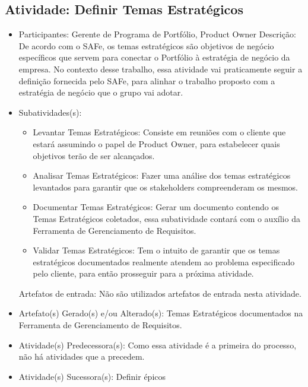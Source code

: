 \subsection{Atividade: Definir Temas Estratégicos}
\begin{itemize}
\item Participantes: Gerente de Programa de Portfólio, Product Owner
Descrição: De acordo com o SAFe, os temas estratégicos são objetivos de negócio específicos que servem para conectar o Portfólio à estratégia de negócio da empresa. No contexto desse trabalho, essa atividade vai praticamente seguir a definição fornecida pelo SAFe, para alinhar o trabalho proposto com a estratégia de negócio que o grupo vai adotar. 

\item Subatividades(s): 
    \begin{itemize}
    \item Levantar Temas Estratégicos: Consiste em reuniões com o cliente que estará assumindo o papel de Product Owner, para estabelecer quais objetivos terão de ser alcançados.
    \item Analisar Temas Estratégicos: Fazer uma análise dos temas estratégicos levantados para garantir que os stakeholders compreenderam os mesmos.
    \item Documentar Temas Estratégicos:  Gerar um documento contendo os Temas Estratégicos coletados, essa subatividade contará com o auxílio da Ferramenta de Gerenciamento de Requisitos.
    \item Validar Temas Estratégicos: Tem o intuito de garantir que os temas estratégicos documentados realmente atendem ao problema especificado pelo cliente, para então prosseguir para a próxima atividade.
    \end{itemize}
	Artefatos de entrada:
    Não são utilizados artefatos de entrada nesta atividade.
 
\item Artefato(s) Gerado(s) e/ou Alterado(s): Temas Estratégicos documentados na Ferramenta de Gerenciamento de Requisitos.
\item Atividade(s) Predecessora(s): Como essa atividade é a primeira do processo, não há atividades que a precedem.
\item Atividade(s) Sucessora(s): Definir épicos

\end{itemize}

